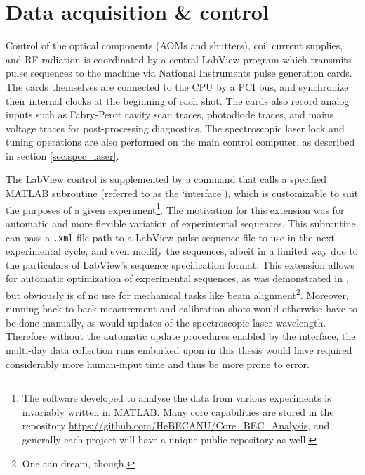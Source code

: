 	



% 




	


\section{Data acquisition \& control}
\label{sec:DAQ}
	
	Control of the optical components (AOMs and shutters), coil current supplies, and RF radiation is coordinated by a central LabView program which transmits pulse sequences to the machine via National Instruments pulse generation cards.
	The cards themselves are connected to the CPU by a PCI bus, and synchronize their internal clocks at the beginning of each shot.
	The cards also record analog inputs such as Fabry-Perot cavity scan traces, photodiode traces, and mains voltage traces for post-processing diagnostics.
	The spectroscopic laser lock and tuning operations are also performed on the main control computer, as described in section \ref{sec:spec_laser}.

	The LabView control is supplemented by a command that calls a specified MATLAB subroutine (referred to as the `interface'), which is customizable to suit the purposes of a given experiment\footnote{The software developed to analyse the data from various experiments is invariably written in MATLAB.	Many core capabilities are stored in the repository \url{https://github.com/HeBECANU/Core_BEC_Analysis}, and generally each project will have a unique public repository as well.}.
	The motivation for this extension was for automatic and more flexible variation of experimental sequences. 
	This subroutine can pass a \verb|.xml| file path to a LabView pulse sequence file to use in the next experimental cycle, and even modify the sequences, albeit in a limited way due to the particulars of LabView's sequence specification format.
	This extension allows for automatic optimization of experimental sequences, as was demonstrated in \cite{HensonML}, but obviously is of no use for mechanical tasks like beam alignment\footnote{One can dream, though.}.
	Moreover, running back-to-back measurement and calibration shots would otherwise have to be done manually, as would updates of the spectroscopic laser wavelength.
	Therefore without the automatic update procedures enabled by the interface, the multi-day data collection runs embarked upon in this thesis would have required considerably more human-input time and thus be more prone to error.
	
